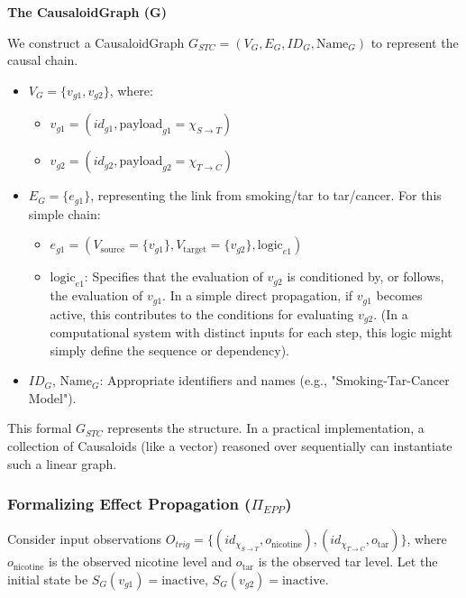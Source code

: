 \textbf{The CausaloidGraph (G)}

We construct a CausaloidGraph \(G_{STC} = (V_G, E_G, ID_G, \text{Name}_G)\) to represent the causal chain.
\begin{itemize}
    \item \(V_G = \{v_{g1}, v_{g2}\}\), where:
    \begin{itemize}
        \item \(v_{g1} = (id_{g1}, \text{payload}_{g1} = \chi_{S \to T})\)
        \item \(v_{g2} = (id_{g2}, \text{payload}_{g2} = \chi_{T \to C})\)
    \end{itemize}
    \item \(E_G = \{e_{g1}\}\), representing the link from smoking/tar to tar/cancer. For this simple chain:
    \begin{itemize}
        \item \(e_{g1} = (V_{\text{source}} = \{v_{g1}\}, V_{\text{target}} = \{v_{g2}\}, \text{logic}_{e1})\)
        \item \(\text{logic}_{e1}\): Specifies that the evaluation of \(v_{g2}\) is conditioned by, or follows, the evaluation of \(v_{g1}\). In a simple direct propagation, if \(v_{g1}\) becomes active, this contributes to the conditions for evaluating \(v_{g2}\). (In a computational system with distinct inputs for each step, this logic might simply define the sequence or dependency).
    \end{itemize}
    \item \(ID_G\), \(\text{Name}_G\): Appropriate identifiers and names (e.g., "Smoking-Tar-Cancer Model").
\end{itemize}
This formal \(G_{STC}\) represents the structure. In a practical implementation, a collection of Causaloids (like a vector) reasoned over sequentially can instantiate such a linear graph.

\subsubsection{Formalizing Effect Propagation (\(\Pi_{EPP}\))}
\label{ssec:example_epp_propagation}

Consider input observations \(O_{trig} = \{ (id_{\chi_{S \to T}}, o_{\text{nicotine}}), (id_{\chi_{T \to C}}, o_{\text{tar}}) \}\), where \(o_{\text{nicotine}}\) is the observed nicotine level and \(o_{\text{tar}}\) is the observed tar level.
Let the initial state be \(S_G(v_{g1})=\text{inactive}\), \(S_G(v_{g2})=\text{inactive}\).

